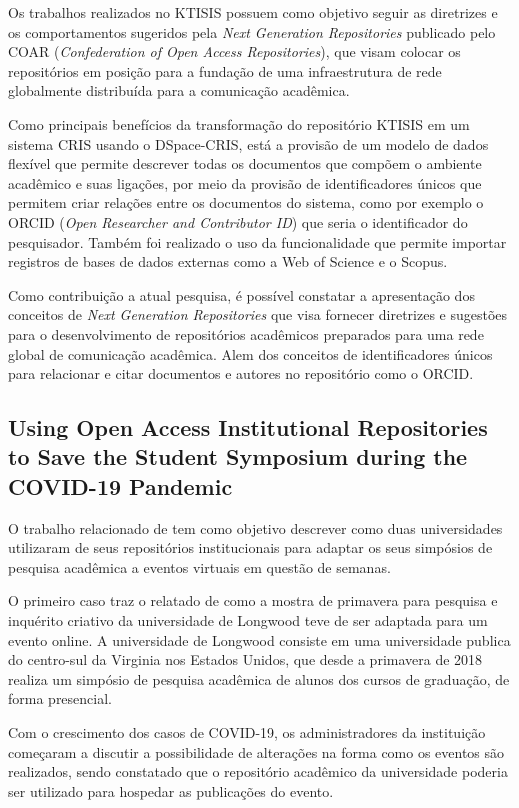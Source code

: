 Os trabalhos realizados no KTISIS possuem como objetivo seguir as diretrizes e
os comportamentos sugeridos pela \emph{Next Generation Repositories} publicado
pelo COAR (\emph{Confederation of Open Access Repositories}), que visam
colocar os repositórios em posição para a fundação de uma infraestrutura de rede
globalmente distribuída para a comunicação acadêmica.

Como principais benefícios da transformação do repositório KTISIS em um sistema
CRIS usando o DSpace-CRIS, está a provisão de um modelo de dados flexível
que permite descrever todas os documentos que compõem o ambiente acadêmico e suas
ligações, por meio da provisão de identificadores únicos que permitem criar relações
entre os documentos do sistema, como por exemplo o ORCID (\emph{Open Researcher and Contributor ID})
que seria o identificador do pesquisador. Também foi realizado o uso da
funcionalidade que permite importar registros de bases de dados externas
como a Web of Science e o Scopus.

Como contribuição a atual pesquisa, é possível constatar a apresentação dos
conceitos de \emph{Next Generation Repositories} que visa fornecer diretrizes
e sugestões para o desenvolvimento de repositórios acadêmicos preparados
para uma rede global de comunicação acadêmica. Alem dos conceitos de identificadores
únicos para relacionar e citar documentos e autores no repositório como o ORCID.

\subsection{Using Open Access Institutional Repositories to Save the Student Symposium during the COVID-19 Pandemic}

O trabalho relacionado de \cite{2022:Symulevich} tem como objetivo
descrever como duas universidades utilizaram de seus repositórios
institucionais para adaptar os seus simpósios de pesquisa acadêmica
a eventos virtuais em questão de semanas.

O primeiro caso traz o relatado de como a mostra de primavera para pesquisa e
inquérito criativo da universidade de Longwood teve de ser adaptada para um
evento online. A universidade de Longwood consiste em uma universidade publica
do centro-sul da Virginia nos Estados Unidos, que desde a primavera de 2018
realiza um simpósio de pesquisa acadêmica de alunos dos cursos de graduação,
de forma presencial.

Com o crescimento dos casos de COVID-19, os administradores da instituição
começaram a discutir a possibilidade de alterações na forma como os eventos
são realizados, sendo constatado que o repositório acadêmico da universidade
poderia ser utilizado para hospedar as publicações do evento.

